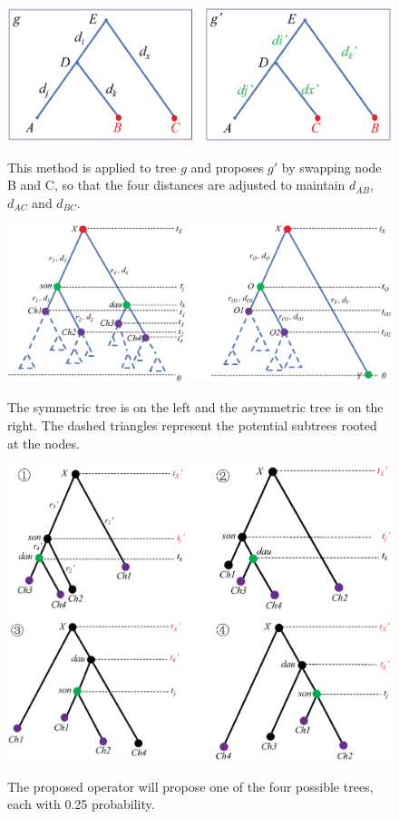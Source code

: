 \documentclass{bmcart}
\begin{document}
\begin{backmatter}
\begin{figure}[h!]
\includegraphics[width=12cm]{exchangemethod.eps}\\
\caption{
             This method is applied to tree $g$ and proposes $g'$ by swapping node B and C, so that the four distances are adjusted to maintain ${d_{AB}}$, ${d_{AC}}$ and ${d_{BC}}$.}
\label{exchangemethod}
\end{figure}

\begin{figure}[h!]
\includegraphics[width=12cm]{treeshape.eps}\\
\caption{
             The symmetric tree is on the left and the asymmetric tree is on the right. The dashed triangles represent the potential subtrees rooted at the nodes.}
\label{treeshape}
\end{figure}

\begin{figure}[h!]
\includegraphics[width=12cm]{symmetric.eps}\\
\caption{
             The proposed operator will propose one of the four possible trees, each with 0.25 probability.}
\label{symmetric}
\end{figure}


\end{backmatter}
\end{document}
